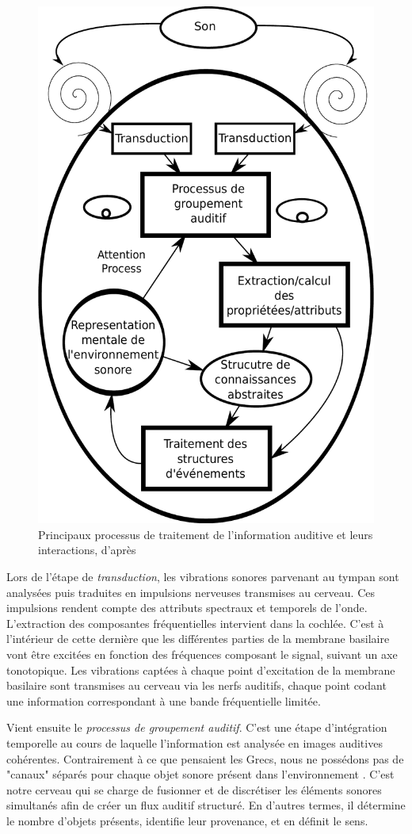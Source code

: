 \begin{figure}[t]
        \myfloatalign
        \includegraphics[width=.6\linewidth]{gfx/traitementSonMcAdamsBigand}
        \caption[Principaux processus de traitement de l'information auditive et leurs interactions]{Principaux processus de traitement de l'information auditive et leurs interactions, d'après \citep{mcadams1994penser}}\label{fig:traitementSonMcAdamsBigand}
\end{figure}

Lors de l'étape de \emph{transduction}, les vibrations sonores parvenant au tympan sont analysées puis traduites en impulsions nerveuses transmises au cerveau. Ces impulsions rendent compte des attributs spectraux et temporels de l'onde. L'extraction des composantes fréquentielles intervient dans la cochlée. C'est à l'intérieur de cette dernière que les différentes parties de la membrane basilaire vont être excitées en fonction des fréquences composant le signal, suivant un axe tonotopique. Les vibrations captées à chaque point d’excitation de la membrane basilaire sont transmises au cerveau via les nerfs auditifs, chaque point codant une information correspondant à une bande fréquentielle limitée. 

Vient ensuite le \emph{processus de groupement auditif}. C'est une étape d'intégration temporelle au cours de laquelle l'information est analysée en images auditives cohérentes. Contrairement à ce que pensaient les Grecs, nous ne possédons pas de "canaux" séparés pour chaque objet sonore présent dans l'environnement \citep{yost1994fundamentals}. C'est notre cerveau qui se charge de fusionner et de discrétiser les éléments sonores simultanés afin de créer un flux auditif structuré. En d'autres termes, il détermine le nombre d'objets présents, identifie leur provenance, et en définit le sens. 

